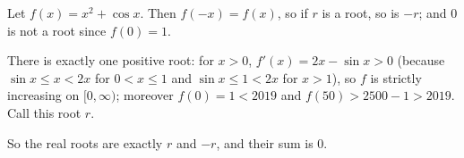 Let $f(x)=x^2+\cos x$. Then $f(-x)=f(x)$, so if $r$ is a root, so is $-r$; and $0$ is not a root since $f(0)=1$.

There is exactly one positive root: for $x>0$, $f'(x)=2x-\sin x>0$ (because $\sin x\le x<2x$ for $0<x\le1$ and $\sin x\le1<2x$ for $x>1$), so $f$ is strictly increasing on $[0,\infty)$; moreover $f(0)=1<2019$ and $f(50)>2500-1>2019$. Call this root $r$.

So the real roots are exactly $r$ and $-r$, and their sum is $\boxed{0}$.

